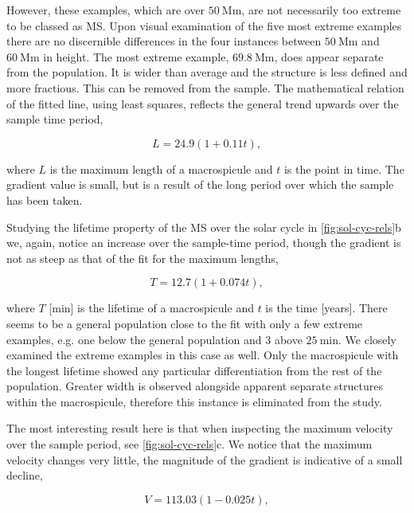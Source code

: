 However, these examples, which are over $50\ \textrm{Mm}$, are not necessarily too extreme to be classed as MS. Upon visual examination of the five most extreme examples there are no discernible differences in the four instances between $50\ \textrm{Mm}$ and $60\ \textrm{Mm}$ in height. The most extreme example, $69.8\ \textrm{Mm}$, does appear separate from the population. It is wider than average and the structure is less defined and more fractious. This can be removed from the sample. The mathematical relation of the fitted line, using least squares, reflects the general trend upwards over the sample time period, 

\begin{equation}
L = 24.9(1 + 0.11t),
\end{equation}

\noindent where $L$ is the maximum length of a macrospicule and $t$ is the point in time. The gradient value is small, but is a result of the long period over which the sample has been taken.

Studying the lifetime property of the MS over the solar cycle in \cref{fig:sol-cyc-rels}b we, again, notice an increase over the sample-time period, though the gradient is not as steep as that of the fit for the maximum lengths, 

\begin{equation}
T = 12.7(1 + 0.074t),
\end{equation}

\noindent where $T$ [min] is the lifetime of a macrospicule and $t$ is the time [years]. There seems to be a general population close to the fit with only a few extreme examples, e.g. one below the general population and 3 above $25\ \textrm{min}$. We closely examined the extreme examples in this case as well. Only the macrospicule with the longest lifetime showed any particular differentiation from the rest of the population. Greater width is observed alongside apparent separate structures within the macrospicule, therefore this instance is eliminated from the study.

The most interesting result here is that when inspecting the maximum velocity over the sample period, see \cref{fig:sol-cyc-rels}c. We notice that the maximum velocity changes very little, the magnitude of the gradient is indicative of a small decline, 

\begin{equation}
V = 113.03(1 - 0.025t),
\end{equation}

